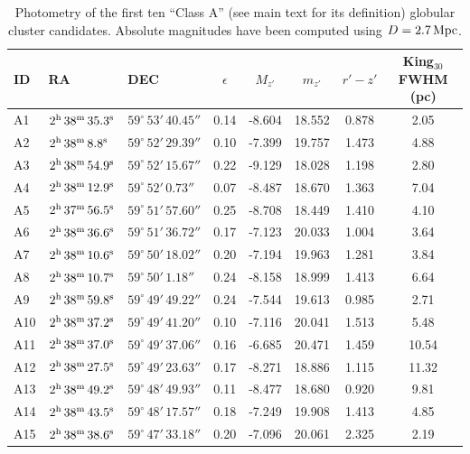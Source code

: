 \documentclass[useAMS,usenatbib]{mn2e}
\begin{document}
\begin{table}
 \centering
 \caption{Photometry of the first ten ``Class A'' (see main text for its definition) globular cluster candidates. Absolute magnitudes have been computed using $D = 2.7\,\rm{Mpc}$.}
\label{tab:class_a}  
\begin{tabular}{lllccccc}
	\hline
	ID & RA & DEC & $\epsilon$ & $M_{z'}$ & $m_{z'}$ & $r'-z'$ & King$_{30}$ FWHM (pc) \\
	\hline
	A1 & $2^{\rm{h}}\,38^{\rm{m}}\,35.3^{\rm{s}}$ & $59^\circ\,53'\,40.45''$ & 0.14 & -8.604 & 18.552 & 0.878 & 2.05 \\
	A2 & $2^{\rm{h}}\,38^{\rm{m}}\,8.8^{\rm{s}}$ & $59^\circ\,52'\,29.39''$ & 0.10 & -7.399 & 19.757 & 1.473 & 4.88 \\
	A3 & $2^{\rm{h}}\,38^{\rm{m}}\,54.9^{\rm{s}}$ & $59^\circ\,52'\,15.67''$ & 0.22 & -9.129 & 18.028 & 1.198 & 2.80 \\
	A4 & $2^{\rm{h}}\,38^{\rm{m}}\,12.9^{\rm{s}}$ & $59^\circ\,52'\,0.73''$ & 0.07 & -8.487 & 18.670 & 1.363 & 7.04 \\
	A5 & $2^{\rm{h}}\,37^{\rm{m}}\,56.5^{\rm{s}}$ & $59^\circ\,51'\,57.60''$ & 0.25 & -8.708 & 18.449 & 1.410 & 4.10 \\
	A6 & $2^{\rm{h}}\,38^{\rm{m}}\,36.6^{\rm{s}}$ & $59^\circ\,51'\,36.72''$ & 0.17 & -7.123 & 20.033 & 1.004 & 3.64 \\
	A7 & $2^{\rm{h}}\,38^{\rm{m}}\,10.6^{\rm{s}}$ & $59^\circ\,50'\,18.02''$ & 0.20 & -7.194 & 19.963 & 1.281 & 3.84 \\
	A8 & $2^{\rm{h}}\,38^{\rm{m}}\,10.7^{\rm{s}}$ & $59^\circ\,50'\,1.18''$ & 0.24 & -8.158 & 18.999 & 1.413 & 6.64 \\
	A9 & $2^{\rm{h}}\,38^{\rm{m}}\,59.8^{\rm{s}}$ & $59^\circ\,49'\,49.22''$ & 0.24 & -7.544 & 19.613 & 0.985 & 2.71 \\
	A10 & $2^{\rm{h}}\,38^{\rm{m}}\,37.2^{\rm{s}}$ & $59^\circ\,49'\,41.20''$ & 0.10 & -7.116 & 20.041 & 1.513 & 5.48 \\
	A11 & $2^{\rm{h}}\,38^{\rm{m}}\,37.0^{\rm{s}}$ & $59^\circ\,49'\,37.06''$ & 0.16 & -6.685 & 20.471 & 1.459 & 10.54 \\
	A12 & $2^{\rm{h}}\,38^{\rm{m}}\,27.5^{\rm{s}}$ & $59^\circ\,49'\,23.63''$ & 0.17 & -8.271 & 18.886 & 1.115 & 11.32 \\
	A13 & $2^{\rm{h}}\,38^{\rm{m}}\,49.2^{\rm{s}}$ & $59^\circ\,48'\,49.93''$ & 0.11 & -8.477 & 18.680 & 0.920 & 9.81 \\
	A14 & $2^{\rm{h}}\,38^{\rm{m}}\,43.5^{\rm{s}}$ & $59^\circ\,48'\,17.57''$ & 0.18 & -7.249 & 19.908 & 1.413 & 4.85 \\
	A15 & $2^{\rm{h}}\,38^{\rm{m}}\,38.6^{\rm{s}}$ & $59^\circ\,47'\,33.18''$ & 0.20 & -7.096 & 20.061 & 2.325 & 2.19 \\
	\hline
\end{tabular}
\end{table}
\end{document}
